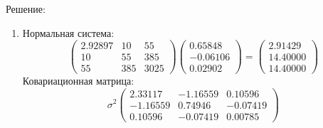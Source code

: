 \documentclass[a4paper,12pt]{article}
\newif\ifsolutions
\begin{document}
\ifsolutions
    Решение:

    \begin{enumerate}
        \item Нормальная система:
              \[
                  \begin{pmatrix}
                      2.92897 & 10  & 55   \\
                      10      & 55  & 385  \\
                      55      & 385 & 3025
                  \end{pmatrix}
                  \begin{pmatrix}
                      0.65848  \\
                      -0.06106 \\
                      0.02902
                  \end{pmatrix}
                  =
                  \begin{pmatrix}
                      2.91429  \\
                      14.40000 \\
                      14.40000
                  \end{pmatrix}
              \]
              Ковариационная матрица:
              \[
                  \sigma^2
                  \begin{pmatrix}
                      2.33117  & -1.16559 & 0.10596  \\
                      -1.16559 & 0.74946  & -0.07419 \\
                      0.10596  & -0.07419 & 0.00785
                  \end{pmatrix}
              \]


\end{enumerate}
\end{document}

